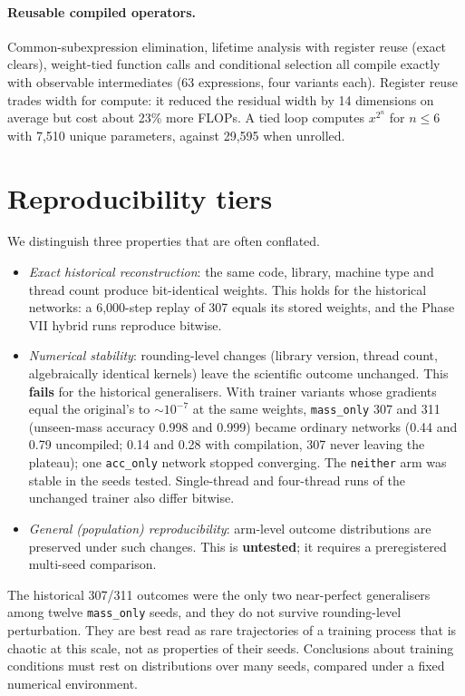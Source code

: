 \documentclass[11pt]{article}
\begin{document}
\paragraph{Reusable compiled operators.} Common-subexpression elimination, lifetime analysis with register reuse
(exact clears), weight-tied function calls and conditional selection all compile exactly with observable
intermediates (63 expressions, four variants each). Register reuse trades width for compute: it reduced the residual
width by 14 dimensions on average but cost about 23\% more FLOPs. A tied loop computes $x^{2^n}$ for $n\le6$ with 7,510
unique parameters, against 29,595 when unrolled.

\section{Reproducibility tiers}\label{sec:tiers}
We distinguish three properties that are often conflated.
\begin{itemize}[leftmargin=*,itemsep=1pt]
\item \emph{Exact historical reconstruction}: the same code, library, machine type and thread count produce
bit-identical weights. This holds for the historical networks: a 6,000-step replay of 307 equals its stored weights, and
the Phase VII hybrid runs reproduce bitwise.
\item \emph{Numerical stability}: rounding-level changes (library version, thread count, algebraically identical
kernels) leave the scientific outcome unchanged. This \textbf{fails} for the historical generalisers. With trainer
variants whose gradients equal the original's to $\sim10^{-7}$ at the same weights, \texttt{mass\_only} 307 and 311
(unseen-mass accuracy 0.998 and 0.999) became ordinary networks (0.44 and 0.79 uncompiled; 0.14 and 0.28 with
compilation, 307 never leaving the plateau); one \texttt{acc\_only} network stopped converging. The
\texttt{neither} arm was stable in the seeds tested. Single-thread and four-thread runs of the unchanged trainer also
differ bitwise.
\item \emph{General (population) reproducibility}: arm-level outcome distributions are preserved under such changes.
This is \textbf{untested}; it requires a preregistered multi-seed comparison.
\end{itemize}
The historical 307/311 outcomes were the only two near-perfect generalisers among twelve \texttt{mass\_only} seeds,
and they do not survive rounding-level perturbation. They are best read as rare trajectories of a training process that
is chaotic at this scale, not as properties of their seeds. Conclusions about training conditions must rest on
distributions over many seeds, compared under a fixed numerical environment.
\end{document}
